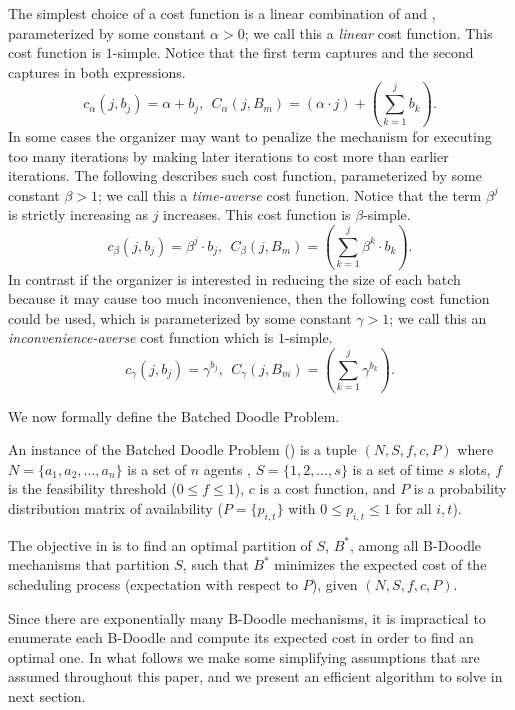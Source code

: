 \begin{example} \label{bdoodle:eg:costFunctions}
The simplest choice of a cost function is a linear combination of \Times and \Inconvenience, parameterized by some constant $\alpha > 0$; we call this a \emph{linear} cost function. This cost function is $1$-simple. Notice that the first term captures \Times and the second captures \Inconveniences in both expressions.  
\begin{equation} \label{bdoodle:eqn:linear_cost_function}
c_{\alpha}(j, b_j) = \alpha + b_j, ~~ C_{\alpha}(j, {B}_m) = \left(\alpha \cdot j\right) + \left(\sum_{k=1}^{j} b_k\right).
\end{equation}
In some cases the organizer may want to penalize the mechanism for executing too many iterations by making later iterations to cost more than earlier iterations. The following describes such cost function, parameterized by some constant $\beta > 1$; we call this a \emph{time-averse} cost function. Notice that the term $\beta^j$ is strictly increasing as $j$ increases. This cost function is $\beta$-simple.
\begin{equation} \label{bdoodle:eqn:time_averse_cost_function}
c_{\beta}(j, b_j) = \beta^j \cdot b_j, ~~ C_{\beta}(j, {B}_m) = \left(\sum_{k=1}^{j} \beta^k \cdot b_k \right).
\end{equation}
In contrast if the organizer is interested in reducing the size of each batch because it may cause too much inconvenience, then the following cost function could be used, which is parameterized by some constant $\gamma > 1$; we call this an \emph{inconvenience-averse} cost function which is $1$-simple.
\begin{equation} \label{bdoodle:eqn:inconvenience_averse_cost_function}
c_{\gamma}(j, b_j) = \gamma^{b_j}, ~~ C_{\gamma}(j, {B}_m) = \left(\sum_{k=1}^{j} \gamma^{b_k} \right).
\end{equation}
\end{example}


We now formally define the Batched Doodle Problem.
\begin{definition} \label{bdoodle:def:bdp}
An instance of the Batched Doodle Problem (\BDP) is a tuple $(N, S, f, c, P)$ where $N = \{a_1, a_2, \dots, a_n\}$ is a set of $n$ agents , $S = \{1, 2, \dots, s\}$ is a set of time $s$ slots, $f$ is the feasibility threshold ($0 \leq f \leq 1$), $c$ is a cost function, and $P$ is a probability distribution matrix of availability ($P = \{p_{i, t}\}$ with $0 \leq p_{i,t}\leq 1$ for all $i, t$).

The objective in \BDPs is to find an optimal partition of $S$, $B^*$, among all B-Doodle mechanisms that partition $S$, such that $B^*$ minimizes the expected cost of the scheduling process (expectation with respect to $P$), given $(N, S, f, c, P)$.
\end{definition}
Since there are exponentially many B-Doodle mechanisms, it is impractical to enumerate each B-Doodle and compute its expected cost in order to find an optimal one. In what follows we make some simplifying assumptions that are assumed throughout this paper, and we present an efficient algorithm to solve \BDPs in next section. 



